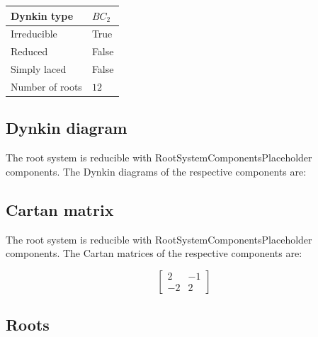 \documentclass[11pt]{article}
\theoremstyle{definition}
\newif\ifrootsystemirreducible
\begin{document}
\begin{tabular}{|l|l|}
	\hline
    Dynkin type & $BC_2$ \\
	\hline
    Irreducible & True \\
	\hline
    Reduced & False \\
	\hline
	Simply laced & False \\
	\hline
	Number of roots & $12$ \\
	\hline
\end{tabular}

\subsection{Dynkin diagram}

\ifrootsystemirreducible
The root system is irreducible and has Dynkin diagram:
\else
The root system is reducible with RootSystemComponentsPlaceholder components. The Dynkin diagrams of the respective components are:
\fi


\subsection{Cartan matrix}

\ifrootsystemirreducible
The root system is irreducible and has Cartan matrix:
\else
The root system is reducible with RootSystemComponentsPlaceholder components. The Cartan matrices of the respective components are:
\fi

\[
\left[\begin{matrix}2 & -1\\-2 & 2\end{matrix}\right]
\]

\subsection{Roots}
\end{document}
